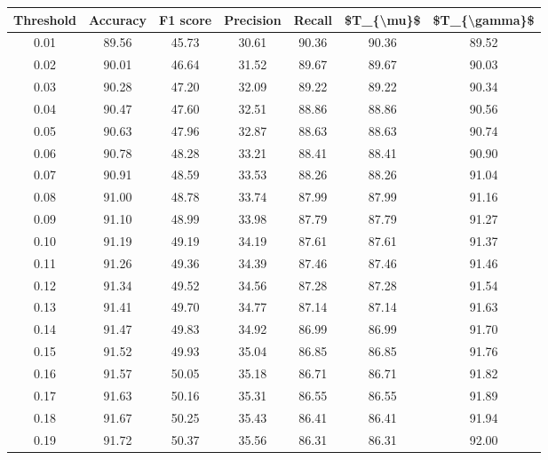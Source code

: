 \begin{tabular}{|c|c|c|c|c|c|c|}
\hline
 Threshold &  Accuracy &  F1 score &  Precision &  Recall &  \$T\_\{\textbackslash mu\}\$ &  \$T\_\{\textbackslash gamma\}\$ \\
\hline
      0.01 &     89.56 &     45.73 &      30.61 &   90.36 &      90.36 &         89.52 \\
      0.02 &     90.01 &     46.64 &      31.52 &   89.67 &      89.67 &         90.03 \\
      0.03 &     90.28 &     47.20 &      32.09 &   89.22 &      89.22 &         90.34 \\
      0.04 &     90.47 &     47.60 &      32.51 &   88.86 &      88.86 &         90.56 \\
      0.05 &     90.63 &     47.96 &      32.87 &   88.63 &      88.63 &         90.74 \\
      0.06 &     90.78 &     48.28 &      33.21 &   88.41 &      88.41 &         90.90 \\
      0.07 &     90.91 &     48.59 &      33.53 &   88.26 &      88.26 &         91.04 \\
      0.08 &     91.00 &     48.78 &      33.74 &   87.99 &      87.99 &         91.16 \\
      0.09 &     91.10 &     48.99 &      33.98 &   87.79 &      87.79 &         91.27 \\
      0.10 &     91.19 &     49.19 &      34.19 &   87.61 &      87.61 &         91.37 \\
      0.11 &     91.26 &     49.36 &      34.39 &   87.46 &      87.46 &         91.46 \\
      0.12 &     91.34 &     49.52 &      34.56 &   87.28 &      87.28 &         91.54 \\
      0.13 &     91.41 &     49.70 &      34.77 &   87.14 &      87.14 &         91.63 \\
      0.14 &     91.47 &     49.83 &      34.92 &   86.99 &      86.99 &         91.70 \\
      0.15 &     91.52 &     49.93 &      35.04 &   86.85 &      86.85 &         91.76 \\
      0.16 &     91.57 &     50.05 &      35.18 &   86.71 &      86.71 &         91.82 \\
      0.17 &     91.63 &     50.16 &      35.31 &   86.55 &      86.55 &         91.89 \\
      0.18 &     91.67 &     50.25 &      35.43 &   86.41 &      86.41 &         91.94 \\
      0.19 &     91.72 &     50.37 &      35.56 &   86.31 &      86.31 &         92.00 \\

\end{tabular}
